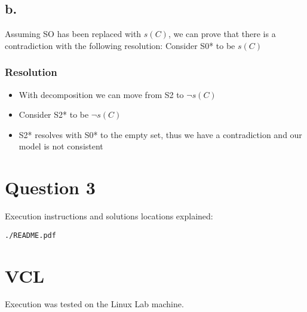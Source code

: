 \documentclass[11pt]{article}
\begin{document}
\subsection{b.}
\label{sec:org72e4e79}
Assuming SO has been replaced with \(s(C)\), we can prove that there is a contradiction with the following resolution:
Consider S0* to be \(s(C)\)
\subsubsection{Resolution}
\label{sec:orge5426b6}
\begin{itemize}
\item With decomposition we can move from S2 to \(\lnot s(C)\)
\item Consider S2* to be \(\lnot s(C)\)
\item S2* resolves with S0* to the empty set, thus we have a contradiction and our model is not consistent
\end{itemize}
\section{Question 3}
\label{sec:org5057d1f}
Execution instructions and solutions locations explained:
\lstset{language=shell,label= ,caption= ,captionpos=b,numbers=none}
\begin{lstlisting}
./README.pdf
\end{lstlisting}
\section{VCL}
\label{sec:org7ab47a0}
Execution was tested on the Linux Lab machine.
\end{document}
